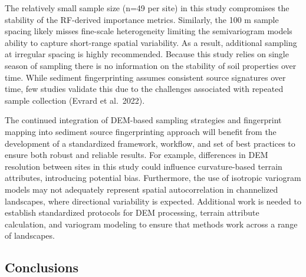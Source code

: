 \documentclass[
  number]{elsarticle}
\begin{document}
The relatively small sample size (n=49 per site) in this study
compromises the stability of the RF-derived importance metrics.
Similarly, the 100 m sample spacing likely misses fine-scale
heterogeneity limiting the semivariogram models ability to capture
short-range spatial variability. As a result, additional sampling at
irregular spacing is highly recommended. Because this study relies on
single season of sampling there is no information on the stability of
soil properties over time. While sediment fingerprinting assumes
consistent source signatures over time, few studies validate this due to
the challenges associated with repeated sample collection (Evrard et
al.~2022).

The continued integration of DEM-based sampling strategies and
fingerprint mapping into sediment source fingerprinting approach will
benefit from the development of a standardized framework, workflow, and
set of best practices to ensure both robust and reliable results. For
example, differences in DEM resolution between sites in this study could
influence curvature-based terrain attributes, introducing potential
bias. Furthermore, the use of isotropic variogram models may not
adequately represent spatial autocorrelation in channelized landscapes,
where directional variability is expected. Additional work is needed to
establish standardized protocols for DEM processing, terrain attribute
calculation, and variogram modeling to ensure that methods work across a
range of landscapes.

\subsection{Conclusions}\label{conclusions}
\end{document}
